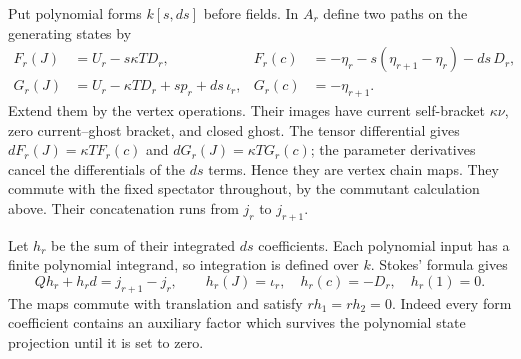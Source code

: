 Put polynomial forms $k[s,ds]$ before fields. In $A_r$ define
two paths on the generating states by
\begin{equation}\label{eq:vol2-supported-paths}
 \begin{aligned}
 F_r(J)&=U_r-s\kappa TD_r,&
 F_r(c)&=-\eta_r-s(\eta_{r+1}-\eta_r)-ds\,D_r,\\
 G_r(J)&=U_r-\kappa TD_r+sp_r+ds\,\iota_r,&
 G_r(c)&=-\eta_{r+1}.
 \end{aligned}
\end{equation}
Extend them by the vertex operations. Their images have current
self-bracket $\kappa\nu$, zero current--ghost bracket, and
closed ghost. The tensor differential gives
$dF_r(J)=\kappa TF_r(c)$ and $dG_r(J)=\kappa TG_r(c)$;
the parameter derivatives cancel the differentials of the
$ds$ terms. Hence they are vertex chain maps. They commute
with the fixed spectator throughout, by the commutant
calculation above. Their concatenation runs from $j_r$ to
$j_{r+1}$.

Let $h_r$ be the sum of their integrated $ds$ coefficients.
Each polynomial input has a finite polynomial integrand, so
integration is defined over $k$. Stokes' formula gives
\begin{equation}\label{eq:vol2-supported-path-integral}
 Qh_r+h_rd=j_{r+1}-j_r,
 \qquad h_r(J)=\iota_r,\quad h_r(c)=-D_r,\quad h_r(1)=0.
\end{equation}
The maps commute with translation and satisfy $rh_1=rh_2=0$.
Indeed every form coefficient contains an auxiliary factor
which survives the polynomial state projection until it is
set to zero.

